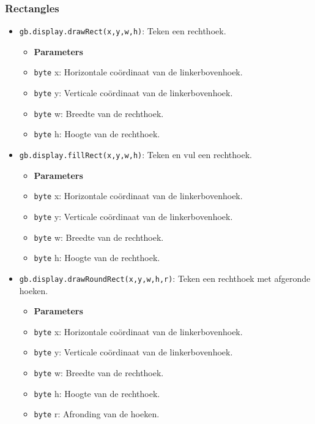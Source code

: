 \documentclass[a4paper,titlepage,12pt]{article}
\begin{document}
	\subsubsection{Rectangles}
	\begin{itemize}
		\item \texttt{gb.display.drawRect(x,y,w,h)}: Teken een rechthoek.
		\begin{itemize}
			\item [] \textbf{Parameters}
			\item \texttt{byte} x: Horizontale coördinaat van de linkerbovenhoek.
			\item \texttt{byte} y: Verticale coördinaat van de linkerbovenhoek.
			\item \texttt{byte} w: Breedte van de rechthoek.
			\item \texttt{byte} h: Hoogte van de rechthoek.
		\end{itemize}
	
		\item \texttt{gb.display.fillRect(x,y,w,h)}: Teken en vul een rechthoek.
		\begin{itemize}
			\item [] \textbf{Parameters}
			\item \texttt{byte} x: Horizontale coördinaat van de linkerbovenhoek.
			\item \texttt{byte} y: Verticale coördinaat van de linkerbovenhoek.
			\item \texttt{byte} w: Breedte van de rechthoek.
			\item \texttt{byte} h: Hoogte van de rechthoek.
		\end{itemize}
	
		\item \texttt{gb.display.drawRoundRect(x,y,w,h,r)}: Teken een rechthoek met afgeronde hoeken.
		\begin{itemize}
			\item [] \textbf{Parameters}
			\item \texttt{byte} x: Horizontale coördinaat van de linkerbovenhoek.
			\item \texttt{byte} y: Verticale coördinaat van de linkerbovenhoek.
			\item \texttt{byte} w: Breedte van de rechthoek.
			\item \texttt{byte} h: Hoogte van de rechthoek.
			\item \texttt{byte} r: Afronding van de hoeken.
		\end{itemize}
	

\end{itemize}
\end{document}
